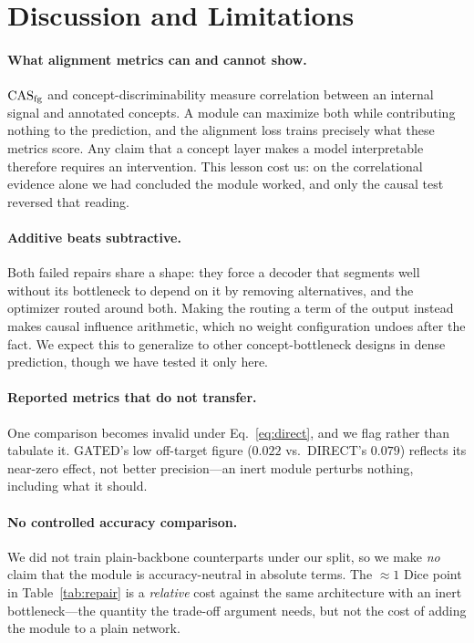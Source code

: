 \section{Discussion and Limitations}
\label{sec:discussion}

\paragraph{What alignment metrics can and cannot show.}
$\mathrm{CAS}_{\mathrm{fg}}$ and concept-discriminability measure correlation between an internal signal and annotated
concepts. A module can maximize both while contributing nothing to the prediction, and the
alignment loss trains precisely what these metrics score. Any claim that a concept layer makes a
model interpretable therefore requires an intervention. This lesson cost us: on the correlational
evidence alone we had concluded the module worked, and only the causal test reversed that reading.

\paragraph{Additive beats subtractive.}
Both failed repairs share a shape: they force a decoder that segments well without its bottleneck
to depend on it by removing alternatives, and the optimizer routed around both. Making the routing
a term of the output instead makes causal influence arithmetic, which no weight configuration
undoes after the fact. We expect this to generalize to other concept-bottleneck designs in dense
prediction, though we have tested it only here.


\paragraph{Reported metrics that do not transfer.}
One comparison becomes invalid under Eq.~\ref{eq:direct}, and we flag rather than tabulate it.
GATED's low off-target figure ($0.022$ vs.\ DIRECT's $0.079$) reflects its near-zero
effect, not better precision---an inert module perturbs nothing, including what it should.

\paragraph{No controlled accuracy comparison.}
We did not train plain-backbone counterparts under our split, so we make \emph{no} claim that the
module is accuracy-neutral in absolute terms. The ${\approx}1$ Dice point in
Table~\ref{tab:repair} is a \emph{relative} cost against the same architecture with an inert
bottleneck---the quantity the trade-off argument needs, but not the cost of adding the module
to a plain network.

